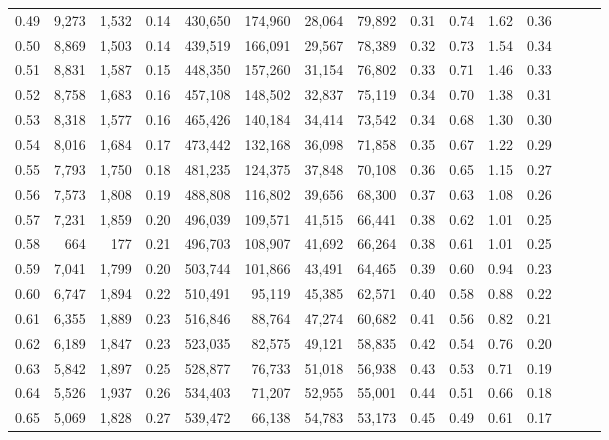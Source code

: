 \begin{tabular}{rrrrrrrrrrrrrrr}
0.49 &   9,273 &  1,532 &  0.14 &  430,650 &  174,960 &   28,064 &   79,892 &  0.31 &  0.74 &  1.62 &      0.36 \\
0.50 &   8,869 &  1,503 &  0.14 &  439,519 &  166,091 &   29,567 &   78,389 &  0.32 &  0.73 &  1.54 &      0.34 \\
0.51 &   8,831 &  1,587 &  0.15 &  448,350 &  157,260 &   31,154 &   76,802 &  0.33 &  0.71 &  1.46 &      0.33 \\
0.52 &   8,758 &  1,683 &  0.16 &  457,108 &  148,502 &   32,837 &   75,119 &  0.34 &  0.70 &  1.38 &      0.31 \\
0.53 &   8,318 &  1,577 &  0.16 &  465,426 &  140,184 &   34,414 &   73,542 &  0.34 &  0.68 &  1.30 &      0.30 \\
0.54 &   8,016 &  1,684 &  0.17 &  473,442 &  132,168 &   36,098 &   71,858 &  0.35 &  0.67 &  1.22 &      0.29 \\
0.55 &   7,793 &  1,750 &  0.18 &  481,235 &  124,375 &   37,848 &   70,108 &  0.36 &  0.65 &  1.15 &      0.27 \\
0.56 &   7,573 &  1,808 &  0.19 &  488,808 &  116,802 &   39,656 &   68,300 &  0.37 &  0.63 &  1.08 &      0.26 \\
0.57 &   7,231 &  1,859 &  0.20 &  496,039 &  109,571 &   41,515 &   66,441 &  0.38 &  0.62 &  1.01 &      0.25 \\
0.58 &     664 &    177 &  0.21 &  496,703 &  108,907 &   41,692 &   66,264 &  0.38 &  0.61 &  1.01 &      0.25 \\
0.59 &   7,041 &  1,799 &  0.20 &  503,744 &  101,866 &   43,491 &   64,465 &  0.39 &  0.60 &  0.94 &      0.23 \\
0.60 &   6,747 &  1,894 &  0.22 &  510,491 &   95,119 &   45,385 &   62,571 &  0.40 &  0.58 &  0.88 &      0.22 \\
0.61 &   6,355 &  1,889 &  0.23 &  516,846 &   88,764 &   47,274 &   60,682 &  0.41 &  0.56 &  0.82 &      0.21 \\
0.62 &   6,189 &  1,847 &  0.23 &  523,035 &   82,575 &   49,121 &   58,835 &  0.42 &  0.54 &  0.76 &      0.20 \\
0.63 &   5,842 &  1,897 &  0.25 &  528,877 &   76,733 &   51,018 &   56,938 &  0.43 &  0.53 &  0.71 &      0.19 \\
0.64 &   5,526 &  1,937 &  0.26 &  534,403 &   71,207 &   52,955 &   55,001 &  0.44 &  0.51 &  0.66 &      0.18 \\
0.65 &   5,069 &  1,828 &  0.27 &  539,472 &   66,138 &   54,783 &   53,173 &  0.45 &  0.49 &  0.61 &      0.17 \\

\end{tabular}
